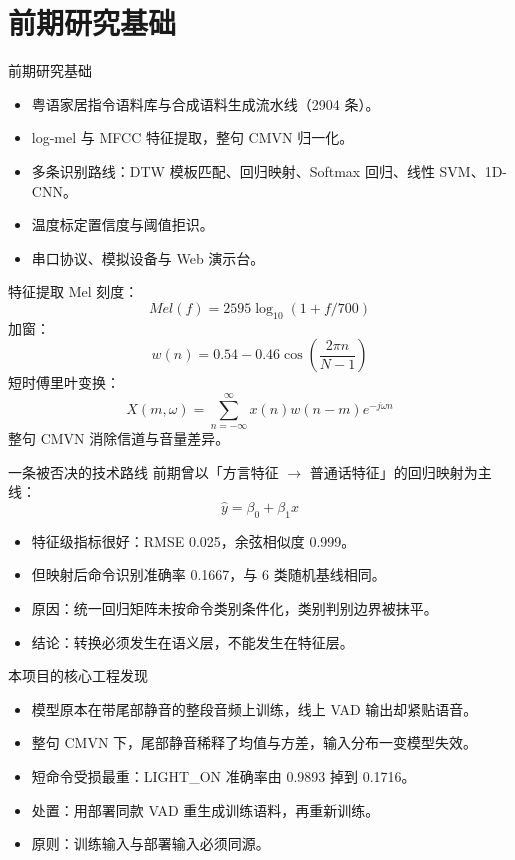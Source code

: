 \documentclass[10pt]{beamer}
\begin{document}
\section{前期研究基础}
\begin{frame}{前期研究基础}
    \begin{itemize}
        \item 粤语家居指令语料库与合成语料生成流水线（2904 条）。
        \item log-mel 与 MFCC 特征提取，整句 CMVN 归一化。
        \item 多条识别路线：DTW 模板匹配、回归映射、Softmax 回归、线性 SVM、1D-CNN。
        \item 温度标定置信度与阈值拒识。
        \item 串口协议、模拟设备与 Web 演示台。
    \end{itemize}
\end{frame}
\begin{frame}{特征提取}
    Mel 刻度：
    \begin{equation}
        Mel(f)=2595\log_{10}(1+f/700)
    \end{equation}
    加窗：
    \begin{equation}
        w(n)=0.54-0.46\cos\left(\frac{2\pi n}{N-1}\right)
    \end{equation}
    短时傅里叶变换：
    \begin{equation}
        X(m,\omega)=\sum_{n=-\infty}^{\infty}x(n)w(n-m)e^{-j\omega n}
    \end{equation}
    整句 CMVN 消除信道与音量差异。
\end{frame}
\begin{frame}{一条被否决的技术路线}
    前期曾以「方言特征 $\to$ 普通话特征」的回归映射为主线：
    \begin{equation}
        \hat{y}=\beta_0+\beta_1 x
    \end{equation}
    \begin{itemize}
        \item 特征级指标很好：RMSE 0.025，余弦相似度 0.999。
        \item 但映射后命令识别准确率 0.1667，与 6 类随机基线相同。
        \item 原因：统一回归矩阵未按命令类别条件化，类别判别边界被抹平。
        \item 结论：转换必须发生在语义层，不能发生在特征层。
    \end{itemize}
\end{frame}
\begin{frame}{本项目的核心工程发现}
    \begin{itemize}
        \item 模型原本在带尾部静音的整段音频上训练，线上 VAD 输出却紧贴语音。
        \item 整句 CMVN 下，尾部静音稀释了均值与方差，输入分布一变模型失效。
        \item 短命令受损最重：LIGHT\_ON 准确率由 0.9893 掉到 0.1716。
        \item 处置：用部署同款 VAD 重生成训练语料，再重新训练。
        \item 原则：训练输入与部署输入必须同源。
    \end{itemize}
\end{frame}
\end{document}
